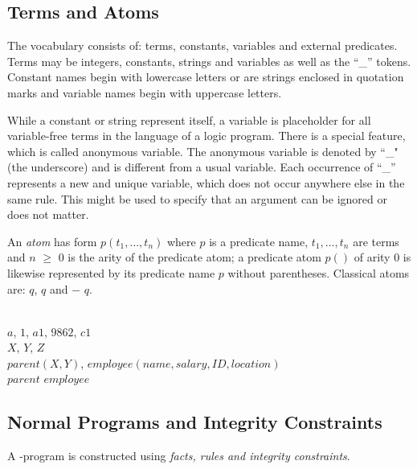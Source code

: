 \documentclass[14pt,a4paper, titlepage]{article}
\begin{document}
\subsection{Terms and Atoms}
The vocabulary consists of: terms, constants, variables and external predicates. Terms may be integers, constants, strings and variables as well as the \enquote{\_} tokens. Constant names begin with lowercase letters or are strings enclosed in quotation marks and variable names begin with uppercase letters.

While a constant or string represent itself, a variable is placeholder for all variable-free terms in the language of a logic program. There is a special feature, which is called anonymous variable. The anonymous variable is denoted by ``\_" (the underscore) and is different from a usual variable. Each occurrence of \enquote{\_} represents a new and unique variable, which does not occur anywhere else in the same rule. This might be used to specify that an argument can be ignored or does not matter.

An \emph{atom} has form $\mathit{p(t_1,\dots,t_n)}$ where $p$ is a predicate name, $t_1,\dots,t_n$ are terms and $n$ $\geq$ $0$ is the arity of the predicate atom; a predicate atom $p()$ of arity 0 is likewise represented by its predicate name $p$ without parentheses. Classical atoms are: $q$, $q$ and $-$ $q$.

\begin{exmp}
\text{   }
\\  $a$, $1$, $\mathit{a1}$, $\mathit{9862}$, $\mathit{c1}$
\\  $X$, $Y$, $Z$
\\  $\mathit{parent}(X,Y)$, $\mathit{employee}(name, salary, ID, location)$
\\  $\mathit{parent}$ $\mathit{employee}$
\end{exmp}
\subsection{Normal Programs and Integrity Constraints}
A \hex{}-program is constructed using \emph{facts, rules and integrity constraints}. 
\end{document}
